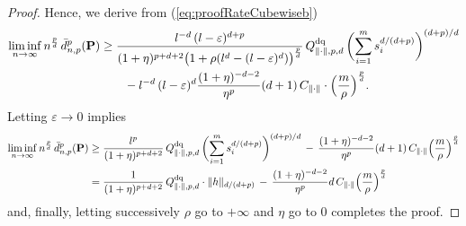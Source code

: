 \begin{proof}
Hence, we derive from 
(\ref{eq:proofRateCubewiseb})
\begin{equation*}
\begin{split}
  \liminf_{n\to\infty} n^{\frac pd}\, \bar d^p_{n,p}(\mathbf{P}) & 
  \geq \frac{l^{-d }\,(l-\varepsilon)^{d+p}}{(1+\eta)^{p+d+2}\bigl(1+\rho (l^d -
  (l-\varepsilon)^d)\bigr)^{\frac pd}}\,Q^{\text{dq}}_{\lVert\cdot\rVert, p, d}\,\biggl(\sum_{i=1}^m s_i^{d/(d+p)}
  \biggr)^{(d+p)/d}
  \\ 
 & \qquad -  l^{-d}\,(l-\varepsilon)^d
  \frac{(1+\eta)^{-d-2}}{\eta^p} (d+1)\,        C_{\lVert\cdot\rVert}\cdot
  \Bigl(\frac{m}{\rho}\Bigr)^{\frac pd}. \\ 
\end{split}
\end{equation*}
Letting $\varepsilon\to 0$ implies
\begin{equation*}
\begin{split}
  \liminf_{n\to\infty} n^{\frac pd}\, \bar d^p_{n,p}(\mathbf{P}) & \geq
  \frac{l^{p}}{(1+\eta)^{p+d+2}}\, Q^{\text{dq}}_{\lVert\cdot\rVert, p, d} \,\biggl(\sum_{i=1}^m s_i^{d/(d+p)}
  \biggr)^{(d+p)/d}
 \, - \,  \frac{(1+\eta)^{-d-2}}{\eta^p}(d+1)\,  
       C_{\lVert\cdot\rVert} 
  \Bigl(\frac{m}{\rho}\Bigr)^{\frac pd}\\
  & =  \frac{1}{(1+\eta)^{p+d+2}}\,Q^{\text{dq}}_{\lVert\cdot\rVert, p, d} \cdot\lVert h\rVert_{d/(d+p)} 
 \, - \, \frac{(1+\eta)^{-d-2}}{\eta^p}d\,
       C_{\lVert\cdot\rVert} 
  \Bigl(\frac{m}{\rho}\Bigr)^{\frac pd}
\end{split}
\end{equation*}
and, finally, letting successively  $\rho$ go to $+\infty$ and $\eta$ go to $0$
completes the proof.
\end{proof}

